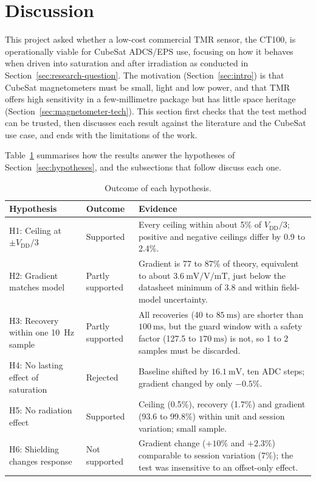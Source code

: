 \documentclass[12pt,a4paper]{article}
\begin{document}
 

\section{Discussion}
\label{sec:discussion}

This project asked whether a low-cost commercial TMR sensor, the CT100, is operationally viable for CubeSat ADCS/EPS use, focusing on how it behaves when driven into saturation and after irradiation as conducted in Section~\ref{sec:research-question}. The motivation (Section~\ref{sec:intro}) is that CubeSat magnetometers must be small, light and low power, and that TMR offers high sensitivity in a few-millimetre package but has little space heritage (Section~\ref{sec:magnetometer-tech}). This section first checks that the test method can be trusted, then discusses each result against the literature and the CubeSat use case, and ends with the limitations of the work.

Table~\ref{tab:hypothesis-outcomes} summarises how the results answer the hypotheses of Section~\ref{sec:hypotheses}, and the subsections that follow discuss each one.

\begin{table}[H]
\centering
\caption{Outcome of each hypothesis.}
\label{tab:hypothesis-outcomes}
\small
\begin{tabular}{@{}>{\raggedright\arraybackslash}p{}>{\raggedright\arraybackslash}p{}>{\raggedright\arraybackslash}p{}@{}}
\toprule
Hypothesis & Outcome & Evidence \\
\midrule
H1: Ceiling at $\pm V_{\text{DD}}/3$ & Supported & Every ceiling within about 5\% of $V_{\text{DD}}/3$; positive and negative ceilings differ by 0.9 to 2.4\%. \\
H2: Gradient matches model & Partly supported & Gradient is 77 to 87\% of theory, equivalent to about $\SI{3.6}{\milli\volt\per\volt\per\milli\tesla}$, just below the datasheet minimum of 3.8 and within field-model uncertainty. \\
H3: Recovery within one \SI{10}{\hertz} sample & Partly supported & All recoveries (40 to $\SI{85}{\milli\second}$) are shorter than $\SI{100}{\milli\second}$, but the guard window with a safety factor (127.5 to $\SI{170}{\milli\second}$) is not, so 1 to 2 samples must be discarded. \\
H4: No lasting effect of saturation & Rejected & Baseline shifted by $\SI{16.1}{\milli\volt}$, ten ADC steps; gradient changed by only $-0.5\%$. \\
H5: No radiation effect & Supported & Ceiling (0.5\%), recovery (1.7\%) and gradient (93.6 to 99.8\%) within unit and session variation; small sample. \\
H6: Shielding changes response & Not supported & Gradient change ($+10\%$ and $+2.3\%$) comparable to session variation (7\%); the test was insensitive to an offset-only effect. \\
\bottomrule
\end{tabular}
\end{table}
\end{document}
